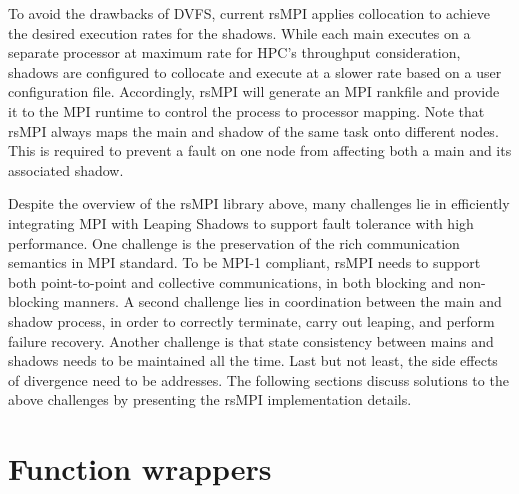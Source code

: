 
To avoid the drawbacks of DVFS, current rsMPI applies collocation to achieve the desired execution rates for the shadows. 
While each main executes on a separate processor at maximum rate for HPC's throughput consideration, shadows are configured to collocate and execute at a slower rate based on a user configuration file. Accordingly, rsMPI will generate an MPI rankfile and provide it to the MPI runtime to control the process to processor mapping. Note that rsMPI always maps the main and shadow of the same task onto different nodes. This is required to prevent a fault on one node from affecting  both a main and its associated  shadow.


Despite the overview of the rsMPI library above, many challenges lie in efficiently integrating MPI with Leaping Shadows to support fault tolerance with high performance. One challenge is the preservation of the rich communication semantics in MPI standard. To be MPI-1 compliant, rsMPI needs to support both point-to-point and collective communications, in both blocking and non-blocking manners. A second challenge lies in coordination between the main and shadow process, in order to correctly terminate, carry out leaping, and perform failure recovery. Another challenge is that state consistency between mains and shadows needs to be maintained all the time. Last but not least, the side effects of divergence need to be addresses. %
The following sections discuss solutions to the above challenges by presenting the rsMPI implementation details. 

\section{Function wrappers}

